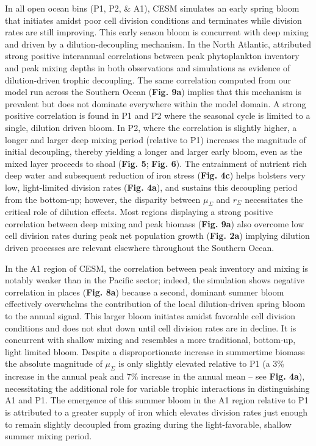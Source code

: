In all open ocean bins (P1, P2, \& A1), CESM simulates an early spring bloom that initiates amidst poor cell division conditions and terminates while division rates are still improving. This early season bloom is concurrent with deep mixing and driven by a dilution-decoupling mechanism. In the North Atlantic, \textcite{BehrenfeldAnnualcyclesecological2013} attributed strong positive interannual correlations between peak phytoplankton inventory and peak mixing depths in both observations and simulations as evidence of dilution-driven trophic decoupling. The same correlation computed from our model run across the Southern Ocean (\textbf{Fig. 9a}) implies that this mechanism is prevalent but does not dominate everywhere within the model domain. A strong positive correlation is found in P1 and P2 where the seasonal cycle is limited to a single, dilution driven bloom. In P2, where the correlation is slightly higher, a longer and larger deep mixing period (relative to P1) increases the magnitude of initial decoupling, thereby yielding a longer and larger early bloom, even as the mixed layer proceeds to shoal (\textbf{Fig. 5}; \textbf{Fig. 6}). The entrainment of nutrient rich deep water \parencite{CarranzaSouthernOceanwinddriven2015} and subsequent reduction of iron stress (\textbf{Fig. 4c}) helps bolsters very low, light-limited division rates (\textbf{Fig. 4a}), and sustains this decoupling period from the bottom-up; however, the disparity between $\mu_\Sigma$ and  $r_\Sigma$ necessitates the critical role of dilution effects. Most regions displaying a strong positive correlation between deep mixing and peak biomass (\textbf{Fig. 9a}) also overcome low cell division rates during peak net population growth (\textbf{Fig. 2a}) implying dilution driven processes are relevant elsewhere throughout the Southern Ocean.

In the A1 region of CESM, the correlation between peak inventory and mixing is notably weaker than in the Pacific sector; indeed, the simulation shows negative correlation in places (\textbf{Fig. 8a}) because a second, dominant summer bloom effectively overwhelms the contribution of the local dilution-driven spring bloom to the annual signal. This larger bloom initiates amidst favorable cell division conditions and does not shut down until cell division rates are in decline. It is concurrent with shallow mixing and resembles a more traditional, bottom-up, light limited bloom. Despite a disproportionate increase in summertime biomass the absolute magnitude of $\mu_\Sigma$ is only slightly elevated relative to P1 (a 3\% increase in the annual peak and 7\% increase in the annual mean – see \textbf{Fig. 4a}), necessitating the additional role for variable trophic interactions in distinguishing A1 and P1. The emergence of this summer bloom in the A1 region relative to P1 is attributed to a greater supply of iron which elevates division rates just enough to remain slightly decoupled from grazing during the light-favorable, shallow summer mixing period. 


